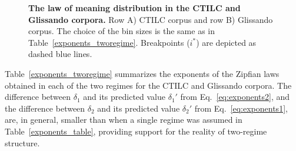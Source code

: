 \documentclass[10pt,letterpaper]{article}
\newif\ifarxiv
\begin{document}
\begin{figure}[!h]
\ifarxiv
\begin{subfigure}[t]{0.02\textwidth}
    \textbf{A}
  \end{subfigure}
\begin{subfigure}{0.32\textwidth}
\texttt{[image: DIEC2\_CTILC\_senseCG\_rank\_grup\_1\_two\_regime10\_set\_bp.png]}
\end{subfigure}\hspace*{\fill}
\begin{subfigure}{0.32\textwidth}
\texttt{[image: DIEC2\_CTILC\_senseCG\_rank\_grup\_5\_two\_regime10\_set\_bp.png]}
\end{subfigure}\hspace*{\fill}
\begin{subfigure}{0.32\textwidth}
\texttt{[image: DIEC2\_CTILC\_senseCG\_rank\_grup\_10\_two\_regime10\_set\_bp.png]}
\end{subfigure}

\vspace{0.5cm}

\begin{subfigure}[t]{0.02\textwidth}
    \textbf{B}
  \end{subfigure}
\begin{subfigure}{0.32\textwidth}
\texttt{[image: DIEC2\_GLISSANDO\_senseCG\_rank\_grup\_1\_two\_regime10\_set\_bp.png]}
\end{subfigure}\hspace*{\fill}
\begin{subfigure}{0.32\textwidth}
\texttt{[image: DIEC2\_GLISSANDO\_senseCG\_rank\_grup\_5\_two\_regime10\_set\_bp.png]}
\end{subfigure}\hspace*{\fill}
\begin{subfigure}{0.32\textwidth}
\texttt{[image: DIEC2\_GLISSANDO\_senseCG\_rank\_grup\_10\_two\_regime10\_set\_bp.png]}
\end{subfigure}
\fi
\caption{\textbf{The law of meaning distribution in the CTILC and Glissando corpora.} Row A) CTILC corpus and row B) Glissando corpus. The choice of the bin sizes is the same as in Table~\ref{exponents_tworegime}. Breakpoints ($i^*$) are depicted as dashed blue lines.}
\label{fig11}
\end{figure}
 
Table~\ref{exponents_tworegime} summarizes the  exponents of the Zipfian laws obtained in each of the two regimes for the CTILC and Glissando corpora. The difference between $\delta_1$ and its predicted value $\delta_1'$ from Eq.~\ref{eq:exponents2}, and the difference between $\delta_2$ and its predicted value $\delta_2'$ from Eq.~\ref{eq:exponents1}, are, in general, smaller than when a single regime was assumed in Table~\ref{exponents_table}, providing support for the reality of two-regime structure.
\end{document}
